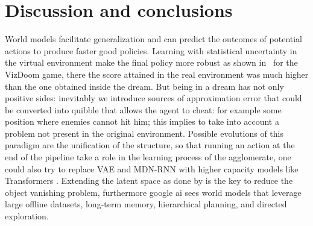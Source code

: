 \documentclass{article}
\begin{document}
\section{Discussion and conclusions}
World models facilitate generalization and can predict the outcomes of 
potential actions to produce faster good policies. Learning with statistical uncertainty in the virtual environment make the final policy more robust
as shown in~\cite{wm} for the VizDoom game, there the score attained in the real environment was much higher than the one obtained inside the dream.
But being in a dream has not only positive sides: inevitably we introduce sources of approximation error
that could be converted into quibble that allows the agent to cheat: for example some position where enemies cannot hit him; this implies to take into account a problem not present in the original environment.
Possible evolutions of this paradigm are the unification of the structure, so that running an action at the end of the pipeline
take a role in the learning process of the agglomerate, one could also try to replace VAE and MDN-RNN with higher capacity models like Transformers \cite{transformers}. Extending the latent space as done by \cite{dreamerv2} is the key to reduce the
object vanishing problem, furthermore google ai sees world models that leverage large offline datasets, long-term memory, hierarchical planning, and directed exploration.\\



\end{document}
